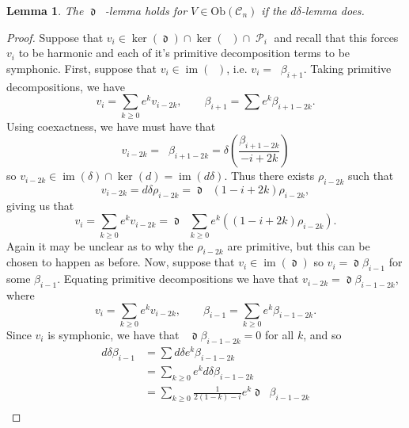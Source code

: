 \documentclass{amsart}
\newtheorem{lemma}[theorem]{Lemma}
\DeclareMathOperator{\dee}{\mathfrak{d}}
\DeclareMathOperator{\deebar}{\overline{\mathfrak{d}}}
\DeclareMathOperator{\Prim}{\mathcal{P}}
\theoremstyle{definition}
\DeclareMathOperator{\im}{im}
\begin{document}
\begin{lemma}\label{ddeltaimpliesdeedeebar}
    The $\dee \deebar$-lemma holds for $V \in \mathrm{Ob}(\mathscr{C}_n)$ if the $d \delta$-lemma does.
\end{lemma}
\begin{proof}
    Suppose that $v_i \in \ker(\dee) \cap \ker(\deebar) \cap \Prim_i$ and recall that this forces $v_i$ to be harmonic and each of it's primitive decomposition terms to be symphonic. First, suppose that $v_i \in \im(\deebar)$, i.e. $v_i = \deebar \beta_{i+1}$. Taking primitive decompositions, we have
    \begin{equation*}
        v_i = \sum_{k \geq 0}e^k v_{i-2k}, \qquad \beta_{i+1}= \sum e^k\beta_{i+1-2k}.
    \end{equation*}
    Using coexactness, we have must have that
    \begin{equation*}
        v_{i-2k} = \deebar \beta_{i+1-2k} = \delta \left( \frac{\beta_{i+1-2k}}{-i+2k}\right)
    \end{equation*}
    so $v_{i-2k} \in \im (\delta) \cap \ker(d) = \im(d\delta)$. Thus there exists $\rho_{i-2k}$ such that
    \begin{equation*}
        v_{i-2k} = d \delta \rho_{i-2k} = \dee \deebar (1-i+2k)\rho_{i-2k},
    \end{equation*}
    giving us that
    \begin{equation*}
        v_i = \sum_{k \geq 0}e^k v_{i-2k} = \dee \deebar \sum_{k \geq 0} e^k((1-i+2k)\rho_{i-2k}).
    \end{equation*}
    Again it may be unclear as to why the $\rho_{i-2k}$ are primitive, but this can be chosen to happen as before. Now, suppose that $v_i \in \im(\dee)$ so $v_i = \dee \beta_{i-1}$ for some $\beta_{i-1}$. Equating primitive decompositions we have that $v_{i-2k}=\dee \beta_{i-1-2k}$, where
    \begin{equation*}
        v_i = \sum_{k \geq 0} e^kv_{i-2k}, \qquad \beta_{i-1} = \sum_{k \geq 0}e^k \beta_{i-1-2k}.
    \end{equation*}
    Since $v_i$ is symphonic, we have that $\deebar \dee \beta_{i-1-2k}=0$ for all $k$, and so
    \begin{align*}
        d \delta \beta_{i-1} &= \sum d \delta e^k \beta_{i-1-2k} \\
        &= \sum_{k \geq 0} e^k d \delta \beta_{i-1-2k} \\
        &= \sum_{k \geq 0} \frac{1}{2(1-k)-i} e^k \dee \deebar \beta_{i-1-2k} \\

\end{align*}
\end{proof}
\end{document}

